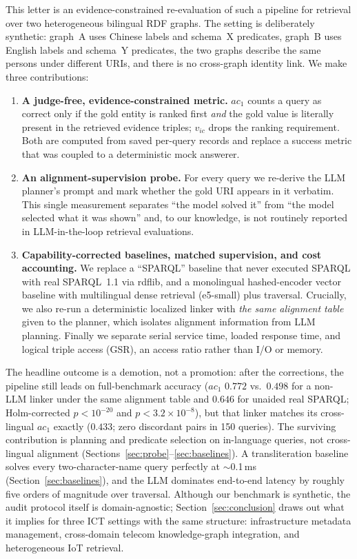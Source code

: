 \documentclass[a4paper,fleqn]{cas-dc}
\newcommand{\ac}[0]{\ensuremath{ac_1}}
\begin{document}
This letter is an evidence-constrained re-evaluation of such a pipeline for
retrieval over two heterogeneous bilingual RDF graphs. The setting is
deliberately synthetic: graph~A uses Chinese labels and schema~X predicates,
graph~B uses English labels and schema~Y predicates, the two graphs describe
the same persons under different URIs, and there is no cross-graph identity
link. We make three contributions:
\begin{enumerate}
\item \textbf{A judge-free, evidence-constrained metric.} \ac{} counts a query
as correct only if the gold entity is ranked first \emph{and} the gold value is
literally present in the retrieved evidence triples; $v_{ic}$ drops the ranking
requirement. Both are computed from saved per-query records and replace a
success metric that was coupled to a deterministic mock answerer.
\item \textbf{An alignment-supervision probe.} For every query we re-derive the
LLM planner's prompt and mark whether the gold URI appears in it verbatim. This
single measurement separates ``the model solved it'' from ``the model selected
what it was shown'' and, to our knowledge, is not routinely reported in
LLM-in-the-loop retrieval evaluations.
\item \textbf{Capability-corrected baselines, matched supervision, and cost
accounting.} We replace a ``SPARQL'' baseline that never executed SPARQL with
real SPARQL~1.1 via rdflib, and a monolingual hashed-encoder vector baseline
with multilingual dense retrieval (e5-small) plus traversal. Crucially, we also
re-run a deterministic localized linker with \emph{the same alignment table}
given to the planner, which isolates alignment information from LLM planning.
Finally we separate serial service time, loaded response time, and logical
triple access (GSR), an access ratio rather than I/O or memory.
\end{enumerate}
The headline outcome is a demotion, not a promotion: after the corrections,
the pipeline still leads on full-benchmark accuracy (\ac{} $0.772$ vs.\
$0.498$ for a non-LLM linker under the same alignment table and $0.646$ for
unaided real SPARQL; Holm-corrected $p<10^{-20}$ and $p<3.2\times10^{-8}$), but
that linker matches its cross-lingual \ac{} exactly ($0.433$; zero discordant
pairs in 150 queries). The surviving contribution is planning and predicate
selection on in-language queries, not cross-lingual alignment
(Sections~\ref{sec:probe}--\ref{sec:baselines}). A transliteration baseline
solves every two-character-name query perfectly at $\sim$0.1\,ms
(Section~\ref{sec:baselines}), and the LLM dominates end-to-end latency by
roughly five orders of magnitude over traversal. Although our benchmark is
synthetic, the audit protocol itself is domain-agnostic;
Section~\ref{sec:conclusion} draws out what it implies for three ICT settings
with the same structure: infrastructure metadata management, cross-domain
telecom knowledge-graph integration, and heterogeneous IoT retrieval.
\end{document}

